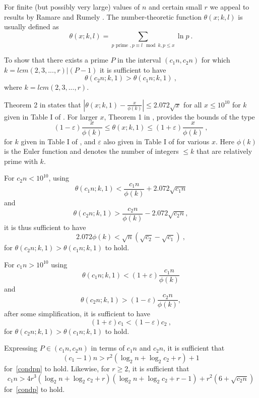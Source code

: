 \documentclass[12pt]{article} \pagestyle{plain} \topmargin
\begin{document}
For finite (but possibly very large) values of $n$ and certain small
$r$ we appeal to results by Ramare and Rumely \cite{rrumely}. The
number-theoretic function $\theta(x;k,l)$ is usually defined as
\[\theta(x;k,l)=\sum_{p \text{ prime }, p \equiv l\mod k, p
\leq x} \ln p~.\]

To show that there exists a prime $P$ in the interval $(c_1n,c_2n)$
for which $k=lcm(2,3,...,r) | (P-1)$  it is sufficient to have
\begin{equation} \label{thetas}\theta(c_2n;k,1)> \theta(c_1n;k,1)~,\end{equation}
where $k=lcm(2,3,...,r)$.

Theorem 2 in \cite{rrumely} states that $|\theta(x;k,1)
-\frac{x}{\phi(k)}| \leq 2.072 \sqrt{x}$ for all $x \leq 10 ^{10}$
for $k$ given in Table I of \cite{rrumely}. For larger $x$, Theorem
1 in \cite{rrumely}, provides the bounds of the type
\begin{equation}
(1-\varepsilon)\frac{x}{\phi(k)} \leq \theta(x;k,1) \leq
(1+\varepsilon)\frac{x}{\phi(k)}~,
\end{equation}
for $k$ given in Table I of \cite{rrumely}, and $\varepsilon$ also
given in Table I of \cite{rrumely} for various $x$. Here $\phi(k)$
is the Euler function and denotes the number of integers $\leq k$
that are relatively prime with $k$.


For $c_2n < 10^{10}$, using \[\theta(c_1n;k,1) <
\frac{c_1n}{\phi(k)}+2.072\sqrt{c_1n}
\]
and \[\theta(c_2n;k,1) > \frac{c_2n}{\phi(k)}-2.072\sqrt{c_2n},
\]it is thus sufficient to have
\begin{equation}\label{cond1}
2.072\phi(k) < \sqrt{n}(\sqrt{c_2}-\sqrt{c_1})~,
\end{equation}
for $\theta(c_2n;k,1)> \theta(c_1n;k,1)$ to hold.


For $c_1n>10^{10}$ using \[\theta(c_1n;k,1) < (1+\varepsilon)
\frac{c_1n}{\phi(k)}
\]
and \[\theta(c_2n;k,1) > (1-\varepsilon)\frac{c_2n}{\phi(k)},
\] after some simplification, it is sufficient to have
\begin{equation}\label{cond1a}
(1+\varepsilon)c_1 < (1-\varepsilon)c_2~,
\end{equation}
for $\theta(c_2n;k,1)> \theta(c_1n;k,1)$ to hold.

 Expressing $P \in (c_1n,c_2n)$ in terms of $c_1n$ and $c_2n$, it is
sufficient that
\begin{equation}\label{cond2}
(c_1-1)n > r^2(\log_2n+\log_2c_2+r)+1
\end{equation}
for~\eqref{condpn} to hold. Likewise, for $r \geq 2$, it is
sufficient that
\begin{equation}\label{cond3}
c_1n>4r^3(\log_2n+\log_2c_2+r)(\log_2n+\log_2c_2+r-1)+r^2(6+\sqrt{c_2n})
\end{equation}
for~\eqref{condp} to hold.
\end{document}
